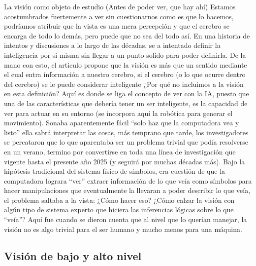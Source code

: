 \documentclass[11pt, letterpaper]{article}
\begin{document}
La visión como objeto de estudio (Antes de poder ver, que hay ahí)
Estamos acostumbrados fuertemente a ver sin cuestionarnos como es que lo hacemos, podríamos atribuir que la vista es una mera percepción y que el cerebro se encarga de todo lo demás, pero puede que no sea del todo así.
En una historia de intentos y discusiones a lo largo de las décadas, se a intentado definir la inteligencia por si misma sin llegar a un punto solido para poder definirla.
De la mano con esto, el articulo propone que la visión es más que un sentido mediante el cual entra información a nuestro cerebro, si el cerebro (o lo que ocurre dentro del cerebro) se le puede considerar inteligente ¿Por qué no incluimos a la visión en esta definición?
Aquí es donde se liga el concepto de ver con la IA, puesto que una de las características que debería tener un ser inteligente, es la capacidad de ver para actuar en su entorno (se incorpora aquí la robótica para generar el movimiento).
Sonaba aparentemente fácil “solo haz que la computadora vea y listo” ella sabrá interpretar las cosas, más temprano que tarde, los investigadores se percataron que lo que aparentaba ser un problema trivial que podía resolverse en un verano, termino por convertirse en toda una línea de investigación que vigente hasta el presente año 2025 (y seguirá por muchas décadas más). 
Bajo la hipótesis tradicional del sistema físico de símbolos, era cuestión de que la computadora lograra “ver” extraer información de lo que veía como símbolos para hacer manipulaciones que eventualmente la llevaran a poder describir lo que veía, el problema saltaba a la vista: ¿Cómo hacer eso? ¿Cómo calzar la visión con algún tipo de sistema experto que hiciera las inferencias lógicas sobre lo que “veía”?
Aquí fue cuando se dieron cuenta que al nivel que lo querían manejar, la visión no es algo trivial para el ser humano y mucho menos para una máquina.


\subsection{Visión de bajo y alto nivel}
\end{document}
